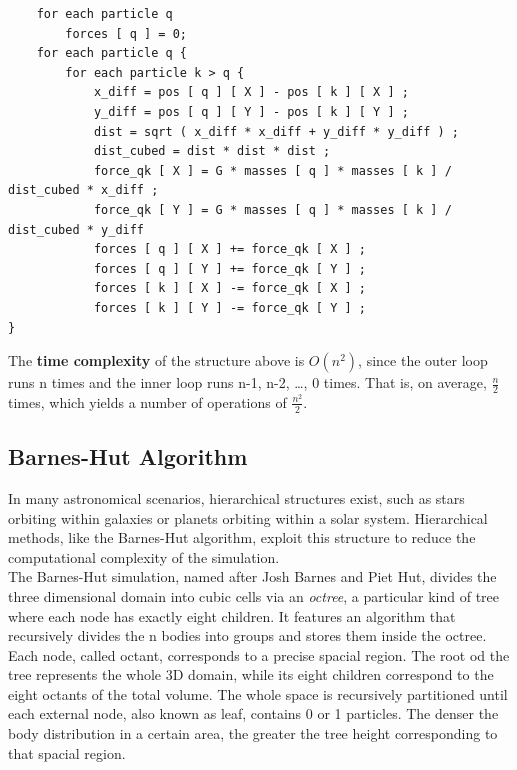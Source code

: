 \documentclass{article}
\begin{document}
\begin{boxA}
\begin{verbatim}
    for each particle q
        forces [ q ] = 0;
    for each particle q {
        for each particle k > q {
            x_diff = pos [ q ] [ X ] - pos [ k ] [ X ] ;
            y_diff = pos [ q ] [ Y ] - pos [ k ] [ Y ] ;
            dist = sqrt ( x_diff * x_diff + y_diff * y_diff ) ;
            dist_cubed = dist * dist * dist ;
            force_qk [ X ] = G * masses [ q ] * masses [ k ] / dist_cubed * x_diff ;
            force_qk [ Y ] = G * masses [ q ] * masses [ k ] / dist_cubed * y_diff
            forces [ q ] [ X ] += force_qk [ X ] ;
            forces [ q ] [ Y ] += force_qk [ Y ] ;
            forces [ k ] [ X ] -= force_qk [ X ] ;
            forces [ k ] [ Y ] -= force_qk [ Y ] ;
}
\end{verbatim}
\end{boxA}

\noindent The \textbf{time complexity} of the structure above is $O(n^2)$, since the outer loop runs n times and the inner loop runs n-1, n-2, \dots, 0 times. That is, on average, $\frac{n}{2}$ times, which yields a number of operations of  $\frac{n^2}{2}$. \\

\subsection{Barnes-Hut Algorithm}
In many astronomical scenarios, hierarchical structures exist, such as stars orbiting within galaxies or planets orbiting within a solar system. Hierarchical methods, like the Barnes-Hut algorithm, exploit this structure to reduce the computational complexity of the simulation. \\

The Barnes-Hut simulation, named after Josh Barnes and Piet Hut, divides the three dimensional domain into cubic cells via an \textit{octree}, a particular kind of tree where each node has exactly eight children. It features an algorithm that recursively divides the n bodies into groups and stores them inside the octree. Each node, called octant, corresponds to a precise spacial region. The root od the tree represents the whole 3D domain, while its eight children correspond to the eight octants of the total volume. The whole space is recursively partitioned until each external node, also known as leaf, contains 0 or 1 particles. The denser the body distribution in a certain area, the greater the tree height corresponding to that spacial region. \\
\end{document}

